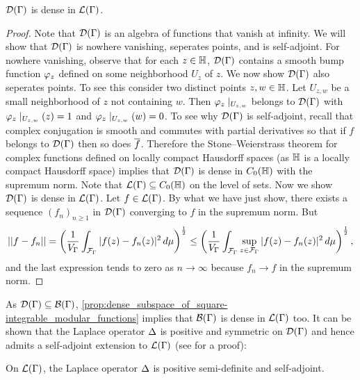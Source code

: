       \begin{proposition}\label{prop:dense_subspace_of_square-integrable_modular_functions}
        $\mathcal{D}(\Gamma)$ is dense in $\mathcal{L}(\Gamma)$.
      \end{proposition}
      \begin{proof}
        Note that $\mathcal{D}(\Gamma)$ is an algebra of functions that vanish at infinity. We will show that $\mathcal{D}(\Gamma)$ is nowhere vanishing, seperates points, and is self-adjoint. For nowhere vanishing, observe that for each $z \in \mathbb{H}$, $\mathcal{D}(\Gamma)$ contains a smooth bump function $\varphi_{z}$ defined on some neighborhood $U_{z}$ of $z$. We now show $\mathcal{D}(\Gamma)$ also seperates points. To see this consider two distinct points $z,w \in \mathbb{H}$. Let $U_{z,w}$ be a small neighborhood of $z$ not containing $w$. Then $\varphi_{z}\mid_{U_{z,w}}$ belongs to $\mathcal{D}(\Gamma)$ with $\varphi_{z}\mid_{U_{z,w}}(z) = 1$ and $\varphi_{z}\mid_{U_{z,w}}(w) = 0$. To see why $\mathcal{D}(\Gamma)$ is self-adjoint, recall that complex conjugation is smooth and commutes with partial derivatives so that if $f$ belongs to $\mathcal{D}(\Gamma)$ then so does $\overline{f}$. Therefore the Stone–Weierstrass theorem for complex functions defined on locally compact Hausdorff spaces (as $\mathbb{H}$ is a locally compact Hausdorff space) implies that $\mathcal{D}(\Gamma)$ is dense in $C_{0}(\mathbb{H})$ with the supremum norm. Note that $\mathcal{L}(\Gamma) \subseteq C_{0}(\mathbb{H})$ on the level of sets. Now we show $\mathcal{D}(\Gamma)$ is dense in $\mathcal{L}(\Gamma)$. Let $f \in \mathcal{L}(\Gamma)$. By what we have just show, there exists a sequence $(f_{n})_{n \ge 1}$ in $\mathcal{D}(\Gamma)$ converging to $f$ in the supremum norm. But 
        \[
        ||f-f_{n}|| = \left(\frac{1}{V_{\Gamma}}\int_{\mathcal{F}_{\Gamma}}|f(z)-f_{n}(z)|^{2}\,d\mu\right)^{\frac{1}{2}} \le \left(\frac{1}{V_{\Gamma}}\int_{\mathcal{F}_{\Gamma}}\sup_{z \in \mathcal{F}_{\Gamma}}|f(z)-f_{n}(z)|^{2}\,d\mu\right)^{\frac{1}{2}},
        \]
        and the last expression tends to zero as $n \to \infty$ because $f_{n} \to f$ in the supremum norm.
      \end{proof}

      As $\mathcal{D}(\Gamma) \subseteq \mathcal{B}(\Gamma)$, \cref{prop:dense_subspace_of_square-integrable_modular_functions} implies that $\mathcal{B}(\Gamma)$ is dense in $\mathcal{L}(\Gamma)$ too. It can be shown that the Laplace operator $\Delta$ is positive and symmetric on $\mathcal{D}(\Gamma)$ and hence admits a self-adjoint extension to $\mathcal{L}(\Gamma)$ (see \cite{iwaniec2002spectral} for a proof):

      \begin{theorem}\label{thm:Laplace_semi-definite_self-adjoint}
        On $\mathcal{L}(\Gamma)$, the Laplace operator $\Delta$ is positive semi-definite and self-adjoint.
      \end{theorem}

